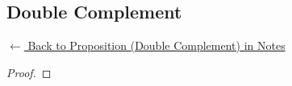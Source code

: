 
\subsection*{Double Complement}
\label{prf:double-complement}

\begin{remark*}[Return]
\hyperref[prop:double-complement]{$\leftarrow$ Back to Proposition (Double Complement) in Notes}
\end{remark*}

\begin{proof}
\end{proof}

\begin{remark*}

\end{remark*}

\begin{remark*}[Dependencies]

\FlashUses{}
\end{remark*}
